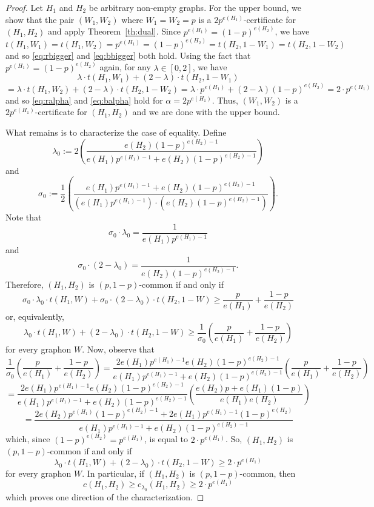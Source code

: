 \documentclass[12pt]{article}
\numberwithin{equation}{section}
\theoremstyle{definition}
\theoremstyle{remark}
\begin{document}
\begin{proof}
Let $H_1$ and $H_2$ be arbitrary non-empty graphs. For the upper bound, we show that the pair $(W_1,W_2)$ where $W_1=W_2=p$ is a $2p^{e(H_1)}$-certificate for $(H_1,H_2)$ and apply Theorem~\ref{th:dual}. Since $p^{e(H_1)}=(1-p)^{e(H_2)}$, we have
\[t(H_1,W_1)=t(H_1,W_2)=p^{e(H_1)}=(1-p)^{e(H_2)}=t(H_2,1-W_1)=t(H_2,1-W_2)\]
and so \eqref{eq:rbigger} and \eqref{eq:bbigger} both hold. Using the fact that $p^{e(H_1)}=(1-p)^{e(H_2)}$ again, for any $\lambda\in[0,2]$, we have
\[\lambda\cdot t(H_1,W_1) + (2-\lambda)\cdot t(H_2,1-W_1)\]
\[=\lambda\cdot t(H_1,W_2) + (2-\lambda)\cdot t(H_2,1-W_2)= \lambda\cdot p^{e(H_1)}+ (2-\lambda)(1-p)^{e(H_2)} = 2\cdot p^{e(H_1)}\]
and so \eqref{eq:ralpha} and \eqref{eq:balpha} hold for $\alpha=2p^{e(H_1)}$. Thus, $(W_1,W_2)$ is a $2p^{e(H_1)}$-certificate for $(H_1, H_2)$ and we are done with the upper bound. 

What remains is to characterize the case of equality. Define
\begin{equation}\label{eq:commonlambda}\lambda_0 :=2\left( \frac{e(H_2)(1-p)^{e(H_2)-1}}{e(H_1)p^{e(H_1)-1} + e(H_2)(1-p)^{e(H_2)-1}}\right)\end{equation}
and
\begin{equation}\label{eq:commonsigma}\sigma_0 := \frac{1}{2}\left(\frac{e(H_1)p^{e(H_1)-1} + e(H_2)(1-p)^{e(H_2)-1}}{\left(e(H_1)p^{e(H_1)-1}\right)\cdot\left(e(H_2)(1-p)^{e(H_2)-1}\right)}\right).\end{equation}
Note that
\begin{equation}\label{eq:lambdasigma1}\sigma_0\cdot\lambda_0 = \frac{1}{e(H_1)p^{e(H_1)-1}}\end{equation}
and
\begin{equation}\label{eq:lambdasigma2}\sigma_0\cdot(2-\lambda_0) = \frac{1}{e(H_2)(1-p)^{e(H_2)-1}}.\end{equation}
Therefore, $(H_1,H_2)$ is $(p,1-p)$-common if and only if 
\[\sigma_0\cdot\lambda_0\cdot t(H_1,W) + \sigma_0\cdot(2-\lambda_0)\cdot t(H_2,1-W)\geq \frac{p}{e(H_1)}+\frac{1-p}{e(H_2)}\]
or, equivalently, 
\[\lambda_0\cdot t(H_1,W) + (2-\lambda_0)\cdot t(H_2,1-W)\geq \frac{1}{\sigma_0}\left(\frac{p}{e(H_1)}+\frac{1-p}{e(H_2)}\right)\]
for every graphon $W$. Now, observe that 
\[\frac{1}{\sigma_0}\left(\frac{p}{e(H_1)}+\frac{1-p}{e(H_2)}\right) = \frac{2e(H_1)p^{e(H_1)-1}e(H_2)(1-p)^{e(H_2)-1}}{e(H_1)p^{e(H_1)-1} + e(H_2)(1-p)^{e(H_2)-1}}\left(\frac{p}{e(H_1)}+\frac{1-p}{e(H_2)}\right)\]
\[ = \frac{2e(H_1)p^{e(H_1)-1}e(H_2)(1-p)^{e(H_2)-1}}{e(H_1)p^{e(H_1)-1} + e(H_2)(1-p)^{e(H_2)-1}}\left(\frac{e(H_2)p+e(H_1)(1-p)}{e(H_1)e(H_2)}\right)\]
\[ = \frac{2e(H_2)p^{e(H_1)}(1-p)^{e(H_2)-1}+2e(H_1)p^{e(H_1)-1}(1-p)^{e(H_2)}}{e(H_1)p^{e(H_1)-1} + e(H_2)(1-p)^{e(H_2)-1}}\]
which, since $(1-p)^{e(H_2)}=p^{e(H_1)}$, is equal to $2\cdot p^{e(H_1)}$. So, $(H_1,H_2)$ is $(p,1-p)$-common if and only if 
\[\lambda_0\cdot t(H_1,W) + (2-\lambda_0)\cdot t(H_2,1-W)\geq2\cdot p^{e(H_1)}\]
for every graphon $W$. In particular, if $(H_1,H_2)$ is $(p,1-p)$-common, then
\[c(H_1,H_2)\geq c_{\lambda_0}(H_1,H_2)\geq 2\cdot p^{e(H_1)}\]
which proves one direction of the characterization. 


\end{proof}
\end{document}
